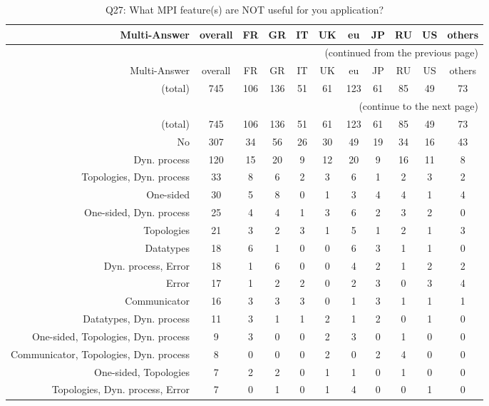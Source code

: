 \clearpage%
{\footnotesize\begin{landscape}%
\begin{longtable}[htb]{r|c|c|c|c|c|c|c|c|c|c}%
\caption{Q27: What MPI feature(s) are NOT useful for you application?}%
\label{tab:Q27-mans} \\%
\hline%
Multi-Answer & overall & FR & GR & IT & UK & eu & JP & RU & US & others \\
 \hline%
\endfirsthead%
\multicolumn{11}{r}{(continued from the previous page)}\\%
\hline%
Multi-Answer & overall & FR & GR & IT & UK & eu & JP & RU & US & others \\
 \hline%
\endhead%
\hline%
(total) & 745 & 106 & 136 & 51 & 61 & 123 & 61 & 85 & 49 & 73 \\%
\hline%
\multicolumn{11}{r}{(continue to the next page)}\\%
\endfoot%
\hline%
(total) & 745 & 106 & 136 & 51 & 61 & 123 & 61 & 85 & 49 & 73 \\%
\hline%
\endlastfoot%
\hline%
{No} & 307 & 34 & 56 & 26 & 30 & 49 & 19 & 34 & 16 & 43 \\%
{Dyn. process} & 120 & 15 & 20 & 9 & 12 & 20 & 9 & 16 & 11 & 8 \\%
{Topologies, Dyn. process} & 33 & 8 & 6 & 2 & 3 & 6 & 1 & 2 & 3 & 2 \\%
{One-sided} & 30 & 5 & 8 & 0 & 1 & 3 & 4 & 4 & 1 & 4 \\%
{One-sided, Dyn. process} & 25 & 4 & 4 & 1 & 3 & 6 & 2 & 3 & 2 & 0 \\%
{Topologies} & 21 & 3 & 2 & 3 & 1 & 5 & 1 & 2 & 1 & 3 \\%
{Datatypes} & 18 & 6 & 1 & 0 & 0 & 6 & 3 & 1 & 1 & 0 \\%
{Dyn. process, Error} & 18 & 1 & 6 & 0 & 0 & 4 & 2 & 1 & 2 & 2 \\%
{Error} & 17 & 1 & 2 & 2 & 0 & 2 & 3 & 0 & 3 & 4 \\%
{Communicator} & 16 & 3 & 3 & 3 & 0 & 1 & 3 & 1 & 1 & 1 \\%
{Datatypes, Dyn. process} & 11 & 3 & 1 & 1 & 2 & 1 & 2 & 0 & 1 & 0 \\%
{One-sided, Topologies, Dyn. process} & 9 & 3 & 0 & 0 & 2 & 3 & 0 & 1 & 0 & 0 \\%
{Communicator, Topologies, Dyn. process} & 8 & 0 & 0 & 0 & 2 & 0 & 2 & 4 & 0 & 0 \\%
{One-sided, Topologies} & 7 & 2 & 2 & 0 & 1 & 1 & 0 & 1 & 0 & 0 \\%
{Topologies, Dyn. process, Error} & 7 & 0 & 1 & 0 & 1 & 4 & 0 & 0 & 1 & 0 \\%

\end{longtable}
\end{landscape}}
